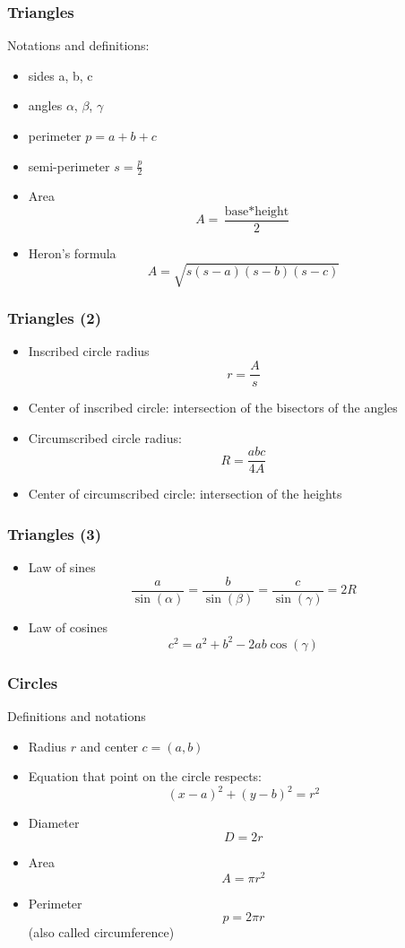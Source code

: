 \documentclass[pdf]{beamer}
\begin{document}
\begin{frame}
	\frametitle{Triangles}
	Notations and definitions:
	\begin{itemize}
		\item sides a, b, c
		\item angles $\alpha$, $\beta$, $\gamma$
		\item perimeter $p = a+b+c$
		\item semi-perimeter $s=\frac{p}{2}$
		\item Area $$A=\frac{\text{base}*\text{height}}{2}$$
		\item Heron's formula
		$$A=\sqrt{s(s-a)(s-b)(s-c)}$$
	\end{itemize}
\end{frame}

\begin{frame}
	\frametitle{Triangles (2)}
	\begin{itemize}
		\item Inscribed circle radius
			$$r=\frac{A}{s}$$
		\item Center of inscribed circle: intersection of the bisectors of the angles
		\item Circumscribed circle radius:
			$$R=\frac{abc}{4A}$$
		\item Center of circumscribed circle:
			intersection of the heights
	\end{itemize}
\end{frame}

\begin{frame}
	\frametitle{Triangles (3)}
	\begin{itemize}
		\item Law of sines
			$$\frac{a}{\sin(\alpha)} = \frac{b}{\sin(\beta)} = \frac{c}{\sin(\gamma)}=2R$$
		\item Law of cosines
			$$c^2=a^2+b^2-2ab\cos(\gamma)$$
	\end{itemize}
\end{frame}

\begin{frame}
	\frametitle{Circles}
	Definitions and notations
	\begin{itemize}
		\item Radius $r$ and center $c = (a,b)$
		\item Equation that point on the circle respects: 
		$$(x-a)^2+(y-b)^2=r^2$$
		\item Diameter $$D=2r$$
		\item Area $$A= \pi r^2$$
		\item Perimeter $$p = 2\pi r$$ (also called circumference)
		
	\end{itemize}
\end{frame}
\end{document}
